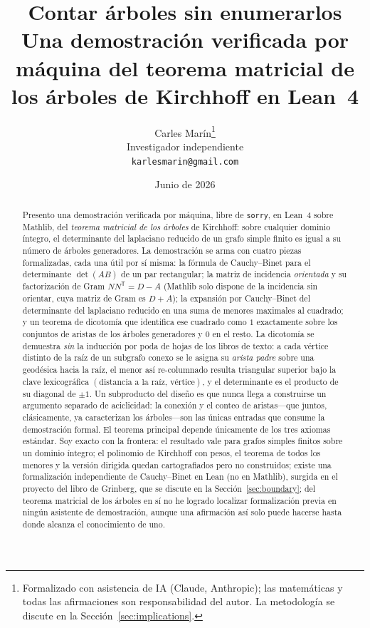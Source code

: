 \documentclass[11pt]{article}
\title{\bf Contar \'arboles sin enumerarlos\\[4pt]
  \large\normalfont Una demostraci\'on verificada por m\'aquina del teorema matricial de los
  \'arboles de Kirchhoff en Lean~4}
\author{Carles Mar\'in\thanks{Formalizado con asistencia de IA (Claude, Anthropic); las
matem\'aticas y todas las afirmaciones son responsabilidad del autor. La metodolog\'ia se
discute en la Secci\'on~\ref{sec:implications}.}\\[3pt]
  \normalsize Investigador independiente\\
  \normalsize \texttt{karlesmarin@gmail.com}}
\date{Junio de 2026}
\newcommand{\lean}[1]{\texttt{#1}}
\begin{document}
\maketitle

\begin{abstract}
Presento una demostraci\'on verificada por m\'aquina, libre de \lean{sorry}, en Lean~4 sobre
Mathlib, del \emph{teorema matricial de los \'arboles} de Kirchhoff: sobre cualquier dominio
\'integro, el determinante del laplaciano reducido de un grafo simple finito es igual a su
n\'umero de \'arboles generadores. La demostraci\'on se arma con cuatro piezas formalizadas,
cada una \'util por s\'i misma: la f\'ormula de Cauchy--Binet para el determinante
$\det(AB)$ de un par rectangular; la matriz de incidencia \emph{orientada} y su factorizaci\'on
de Gram $NN^{\mathsf T}=D-A$ (Mathlib solo dispone de la incidencia sin orientar, cuya matriz
de Gram es $D+A$); la expansi\'on por Cauchy--Binet del determinante del laplaciano reducido en
una suma de menores maximales al cuadrado; y un teorema de dicotom\'ia que identifica ese
cuadrado como $1$ exactamente sobre los conjuntos de aristas de los \'arboles generadores y $0$
en el resto. La dicotom\'ia se demuestra \emph{sin} la inducci\'on por poda de hojas de los
libros de texto: a cada v\'ertice distinto de la ra\'iz de un subgrafo conexo se le asigna su
\emph{arista padre} sobre una geod\'esica hacia la ra\'iz, el menor as\'i re-columnado resulta
triangular superior bajo la clave lexicogr\'afica $(\text{distancia a la ra\'iz},\,
\text{v\'ertice})$, y el determinante es el producto de su diagonal de $\pm1$. Un subproducto
del dise\~no es que nunca llega a construirse un argumento separado de aciclicidad: la
conexi\'on y el conteo de aristas---que juntos, cl\'asicamente, ya caracterizan los
\'arboles---son las \'unicas entradas que consume la demostraci\'on formal. El teorema principal depende \'unicamente de los tres axiomas est\'andar. Soy
exacto con la frontera: el resultado vale para grafos simples finitos sobre un dominio
\'integro; el polinomio de Kirchhoff con pesos, el teorema de todos los menores y la versi\'on
dirigida quedan cartografiados pero no construidos; existe una formalizaci\'on independiente de
Cauchy--Binet en Lean (no en Mathlib), surgida en el proyecto del libro de Grinberg, que se
discute en la Secci\'on~\ref{sec:boundary}; del teorema matricial de los \'arboles en s\'i no
he logrado localizar formalizaci\'on previa en ning\'un asistente de demostraci\'on, aunque una
afirmaci\'on as\'i solo puede hacerse hasta donde alcanza el conocimiento de uno.
\end{abstract}
\end{document}

